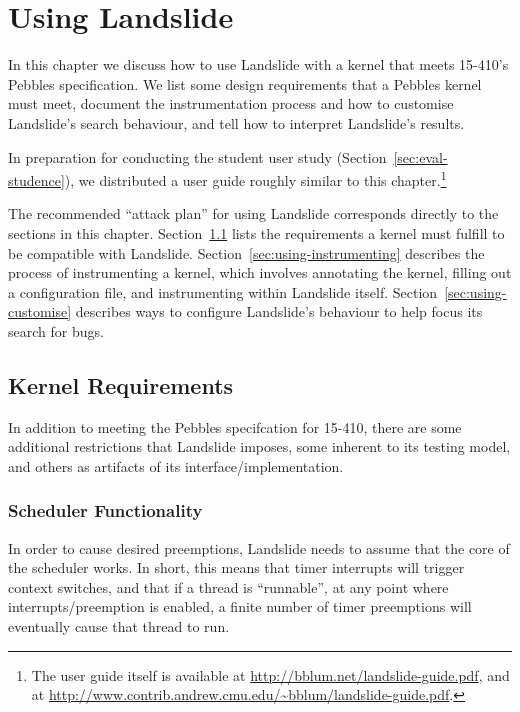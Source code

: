 \chapter{Using Landslide}
\label{sec:using}

In this chapter we discuss how to use Landslide with a kernel that meets 15-410's Pebbles specification. We list some design requirements that a Pebbles kernel must meet, document the instrumentation process and how to customise Landslide's search behaviour, and tell how to interpret Landslide's results.

In preparation for conducting the student user study (Section~\ref{sec:eval-studence}), we distributed a user guide roughly similar to this chapter.\footnote{
The user guide itself is available at \url{http://bblum.net/landslide-guide.pdf}, and at \url{http://www.contrib.andrew.cmu.edu/~bblum/landslide-guide.pdf}.}

The recommended ``attack plan'' for using Landslide corresponds directly to the sections in this chapter. Section~\ref{sec:using-requirements} lists the requirements a kernel must fulfill to be compatible with Landslide. Section~\ref{sec:using-instrumenting} describes the process of instrumenting a kernel, which involves annotating the kernel, filling out a configuration file, and instrumenting within Landslide itself. Section~\ref{sec:using-customise} describes ways to configure Landslide's behaviour to help focus its search for bugs.

\section{Kernel Requirements}
\label{sec:using-requirements}

In addition to meeting the Pebbles specifcation for 15-410, there are some additional restrictions that Landslide imposes, some inherent to its testing model, and others as artifacts of its interface/implementation.

\subsection{Scheduler Functionality}
\label{sec:using-requirements-sched}

In order to cause desired preemptions, Landslide needs to assume that the core of the scheduler works. In short, this means that timer interrupts will trigger context switches, and that if a thread is ``runnable'', at any point where interrupts/preemption is enabled, a finite number of timer preemptions will eventually cause that thread to run.

